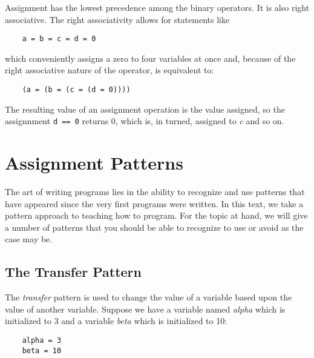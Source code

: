 Assignment has the lowest precedence among the binary operators. It is
also right associative. The right associativity allows for statements like

\color{CodeGreen}
\begin{codesize}
\begin{verbatim}
    a = b = c = d = 0
\end{verbatim}
\end{codesize}
\color{black}

which conveniently assigns a zero to four variables at once and,
because of the right associative nature of the operator, is 
equivalent to:

\color{CodeGreen}
\begin{codesize}
\begin{verbatim}
    (a = (b = (c = (d = 0))))
\end{verbatim}
\end{codesize}
\color{black}

The resulting value of an assignment operation is the value assigned,
so the assignnment {\tt\codesize d == 0} returns 0, which is,
in turned,
assigned to
{\it c} and so on.

\section{Assignment Patterns}

The art of writing programs lies in the ability to
recognize and use patterns that have appeared since the
very first programs were written. In this text, we take
a pattern approach to teaching how to program. For the
topic at hand, we will give a number of patterns that
you should be able to recognize to use or avoid as
the case may be.

\subsection{The Transfer Pattern}

The {\it transfer} pattern is used to  change the value of a
variable based upon the value of another variable.
Suppose we have a variable named {\it alpha} which is initialized
to 3 and a variable {\it beta} which is initialized to 10:

\color{CodeGreen}
\begin{codesize}
\begin{verbatim}
    alpha = 3
    beta = 10
\end{verbatim}
\end{codesize}
\color{black}

